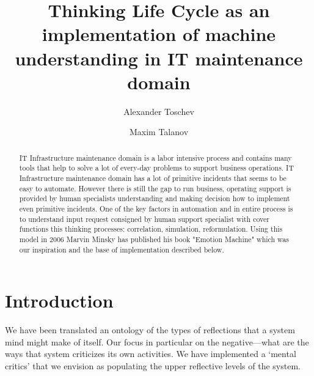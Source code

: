 \documentclass[runningheads,a4paper]{llncs}
\begin{document}
\mainmatter

\title{Thinking Life Cycle as an implementation of machine understanding in IT maintenance domain}


\author{Alexander Toschev \and Maxim Talanov}


\maketitle

\begin{abstract}
IT Infrastructure maintenance domain is a labor intensive process and contains many tools that help to solve a lot of every-day problems to support business operations. IT Infrastructure maintenance domain has a lot of primitive incidents that seems to be easy to automate. However there is still the gap to run business, operating support is provided by human specialists understanding and making decision how to implement even primitive incidents. One of the key factors in automation and in entire process is to understand input request consigned by human support specialist with cover functions this thinking processes:  correlation, simulation, reformulation. Using this model in 2006 Marvin Minsky has published his book "Emotion Machine" \cite{mmem} which was our inspiration and the base of implementation described below.


\end{abstract}

\section{Introduction}
We have been translated an ontology of the types of reflections that a system mind might make of itself. Our focus in particular on the negative—what are the ways that system criticizes its own activities.  We have implemented a ‘mental critics’ that we envision as populating the upper reflective levels of the system.
\end{document}
